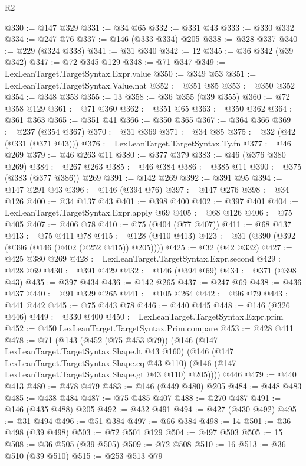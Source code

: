 \begin{lexlean}{R2}
\begin{coremodule}
@330 := @147 @329
@331 := @34 @65
@332 := @331 @43
@333 := @330 @332
@334 := @247 @76
@337 := @146 (@333 @334) @205
@338 := @328 @337
@340 := @229 (@324 @338)
@341 := @31 @340
@342 := 12
@345 := @36 @342 (@39 @342)
@347 := @72 @345 @129
@348 := @71 @347
@349 := LexLeanTarget.TargetSyntax.Expr.value
@350 := @349 @53
@351 := LexLeanTarget.TargetSyntax.Value.nat
@352 := @351 @85
@353 := @350 @352
@354 := @348 @353
@355 := 13
@358 := @36 @355 (@39 @355)
@360 := @72 @358 @129
@361 := @71 @360
@362 := @351 @65
@363 := @350 @362
@364 := @361 @363
@365 := @351 @41
@366 := @350 @365
@367 := @364 @366
@369 := @237 (@354 @367)
@370 := @31 @369
@371 := @34 @85
@375 := @32 (@42 (@331 (@371 @43)))
@376 := LexLeanTarget.TargetSyntax.Ty.fn
@377 := @46 @269
@379 := @46 @263 @11
@380 := @377 @379
@383 := @46 (@376 @380 @269)
@384 := @267 @263
@385 := @46 @384
@386 := @385 @11
@390 := @375 (@383 (@377 @386)) @269
@391 := @142 @269
@392 := @391 @95
@394 := @147 @291 @43
@396 := @146 (@394 @76)
@397 := @147 @276
@398 := @34 @126
@400 := @34 @137 @43
@401 := @398 @400
@402 := @397 @401
@404 := LexLeanTarget.TargetSyntax.Expr.apply @69
@405 := @68 @126
@406 := @75 @405
@407 := @406 @78
@410 := @75 (@404 (@77 @407))
@411 := @68 @137
@413 := @75 @411 @78
@415 := @128 (@410 @413)
@423 := @31 (@390 (@392 (@396 (@146 (@402 (@252 @415)) @205))))
@425 := @32 (@42 @332)
@427 := @425 @380 @269
@428 := LexLeanTarget.TargetSyntax.Expr.second
@429 := @428 @69
@430 := @391 @429
@432 := @146 (@394 @69)
@434 := @371 (@398 @43)
@435 := @397 @434
@436 := @142 @265
@437 := @247 @69
@438 := @436 @437
@440 := @91 @329 @265
@441 := @105 @264
@442 := @96 @79
@443 := @441 @442
@445 := @75 @443 @78
@446 := @440 @445
@448 := @146 (@326 @446)
@449 := @330 @400
@450 := LexLeanTarget.TargetSyntax.Expr.prim
@452 := @450 LexLeanTarget.TargetSyntax.Prim.compare
@453 := @428 @411
@478 := @71
    (@143
      (@452 (@75 @453 @79))
      (@146
        (@147 LexLeanTarget.TargetSyntax.Shape.lt @43 @160)
        (@146
          (@147 LexLeanTarget.TargetSyntax.Shape.eq @43 @110)
          (@146 (@147 LexLeanTarget.TargetSyntax.Shape.gt @43 @110) @205))))
    @446
@479 := @440 @413
@480 := @478 @479
@483 := @146 (@449 @480) @205
@484 := @448 @483
@485 := @438 @484
@487 := @75 @485 @407
@488 := @270 @487
@491 := @146 (@435 @488) @205
@492 := @432 @491
@494 := @427 (@430 @492)
@495 := @31 @494
@496 := @51 @384
@497 := @66 @384
@498 := 14
@501 := @36 @498 (@39 @498)
@503 := @72 @501 @129
@504 := @497 @503
@505 := 15
@508 := @36 @505 (@39 @505)
@509 := @72 @508
@510 := 16
@513 := @36 @510 (@39 @510)
@515 := @253 @513 @79

\end{coremodule}
\end{lexlean}
